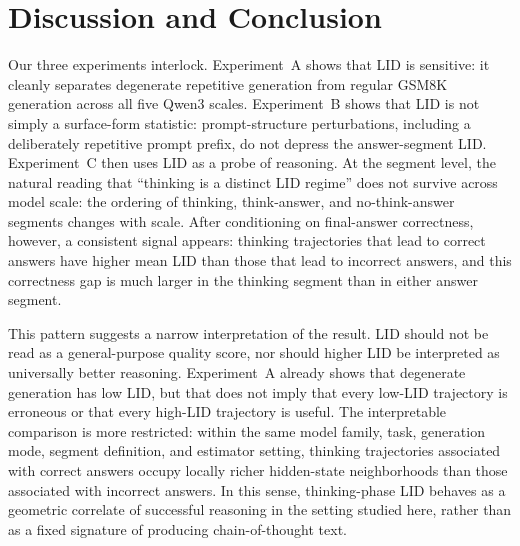 \documentclass{article}
\theoremstyle{plain}
\theoremstyle{definition}
\theoremstyle{remark}
\begin{document}
\section{Discussion and Conclusion}

Our three experiments interlock. Experiment~A shows that LID is sensitive: it cleanly separates degenerate repetitive generation from regular GSM8K generation across all five Qwen3 scales. Experiment~B shows that LID is not simply a surface-form statistic: prompt-structure perturbations, including a deliberately repetitive prompt prefix, do not depress the answer-segment LID. Experiment~C then uses LID as a probe of reasoning. At the segment level, the natural reading that ``thinking is a distinct LID regime'' does not survive across model scale: the ordering of thinking, think-answer, and no-think-answer segments changes with scale. After conditioning on final-answer correctness, however, a consistent signal appears: thinking trajectories that lead to correct answers have higher mean LID than those that lead to incorrect answers, and this correctness gap is much larger in the thinking segment than in either answer segment.

This pattern suggests a narrow interpretation of the result. LID should not be read as a general-purpose quality score, nor should higher LID be interpreted as universally better reasoning. Experiment~A already shows that degenerate generation has low LID, but that does not imply that every low-LID trajectory is erroneous or that every high-LID trajectory is useful. The interpretable comparison is more restricted: within the same model family, task, generation mode, segment definition, and estimator setting, thinking trajectories associated with correct answers occupy locally richer hidden-state neighborhoods than those associated with incorrect answers. In this sense, thinking-phase LID behaves as a geometric correlate of successful reasoning in the setting studied here, rather than as a fixed signature of producing chain-of-thought text.
\end{document}
